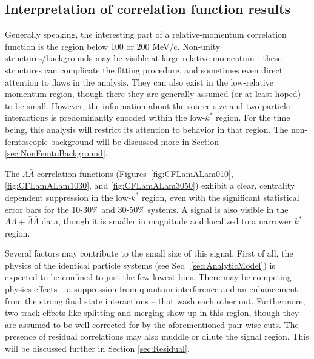 \subsection{Interpretation of correlation function results}
\label{sec:CFInterpretation}


Generally speaking, the interesting part of a relative-momentum correlation function is the region below 100 or 200 MeV/c.  
Non-unity structures/backgrounds may be visible at large relative momentum - these structures can complicate the fitting procedure, and sometimes even direct attention to flaws in the analysis.  
They can also exist in the low-relative momentum region, though there they are generally assumed (or at least hoped) to be small.
However, the information about the source size and two-particle interactions is predominantly encoded within the low-$k^*$ region.  
For the time being, this analysis will restrict its attention to behavior in that region.
The non-femtoscopic background will be discussed more in Section \ref{sec:NonFemtoBackground}.

The $\Lambda\bar{\Lambda}$ correlation functions (Figures\ \ref{fig:CFLamALam010}, \ref{fig:CFLamALam1030}, and \ref{fig:CFLamALam3050}) exhibit a clear, centrality dependent suppression in the low-$k^*$ region, even with the significant statistical error bars for the 10-30\% and 30-50\% systems.  
A signal is also visible in the $\Lambda\Lambda + \bar{\Lambda}\bar{\Lambda}$ data, though it is smaller in magnitude and localized to a narrower $k^*$ region. 

Several factors may contribute to the small size of this signal.  
First of all, the physics of the identical particle systems (see Sec.\ \ref{sec:AnalyticModel}) is expected to be confined to just the few lowest bins.  
There may be competing physics effects -- a suppression from quantum interference and an enhancement from the strong final state interactions -- that wash each other out.  
Furthermore, two-track effects like splitting and merging show up in this region, though they are assumed to be well-corrected for by the aforementioned pair-wise cuts.  
The presence of residual correlations may also muddle or dilute the signal region.  
This will be discussed further in Section \ref{sec:Residual}.  

